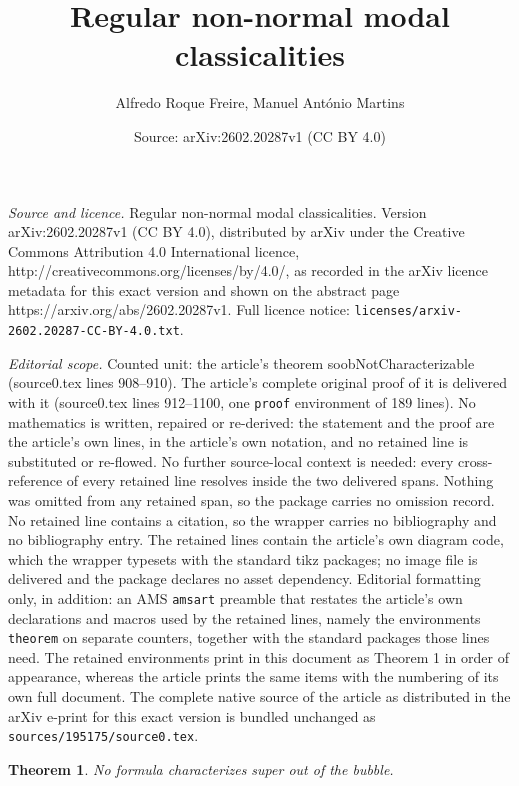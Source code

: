 \documentclass[10pt,a4paper]{amsart}
\title{Regular non-normal modal classicalities}
\author{Alfredo Roque Freire, Manuel Ant\'onio Martins}
\date{Source: arXiv:2602.20287v1 (CC BY 4.0)}
\newtheorem{theorem}{Theorem}
\begin{document}
\maketitle

\noindent\emph{Source and licence.} Regular non-normal modal classicalities. Version arXiv:2602.20287v1 (CC BY 4.0), distributed by arXiv under the Creative Commons Attribution 4.0 International licence, http://creativecommons.org/licenses/by/4.0/, as recorded in the arXiv licence metadata for this exact version and shown on the abstract page https://arxiv.org/abs/2602.20287v1. Full licence notice: \texttt{licenses/arxiv-2602.20287-CC-BY-4.0.txt}.\par\smallskip

\noindent\textit{Editorial scope.} Counted unit: the article's theorem soobNotCharacterizable (source0.tex lines 908--910). The article's complete original proof of it is delivered with it (source0.tex lines 912--1100, one \texttt{proof} environment of 189 lines). No mathematics is written, repaired or re-derived: the statement and the proof are the article's own lines, in the article's own notation, and no retained line is substituted or re-flowed.  No further source-local context is needed: every cross-reference of every retained line resolves inside the two delivered spans.  Nothing was omitted from any retained span, so the package carries no omission record.  No retained line contains a citation, so the wrapper carries no bibliography and no bibliography entry.  The retained lines contain the article's own diagram code, which the wrapper typesets with the standard tikz packages; no image file is delivered and the package declares no asset dependency.  Editorial formatting only, in addition: an AMS \texttt{amsart} preamble that restates the article's own declarations and macros used by the retained lines, namely the environments \texttt{theorem} on separate counters, together with the standard packages those lines need.  The retained environments print in this document as Theorem 1 in order of appearance, whereas the article prints the same items with the numbering of its own full document.  The complete native source of the article as distributed in the arXiv e-print for this exact version is bundled unchanged as \texttt{sources/195175/source0.tex}.
\begin{theorem}\label{soobNotCharacterizable}
    No formula characterizes super out of the bubble.
\end{theorem}
\end{document}
